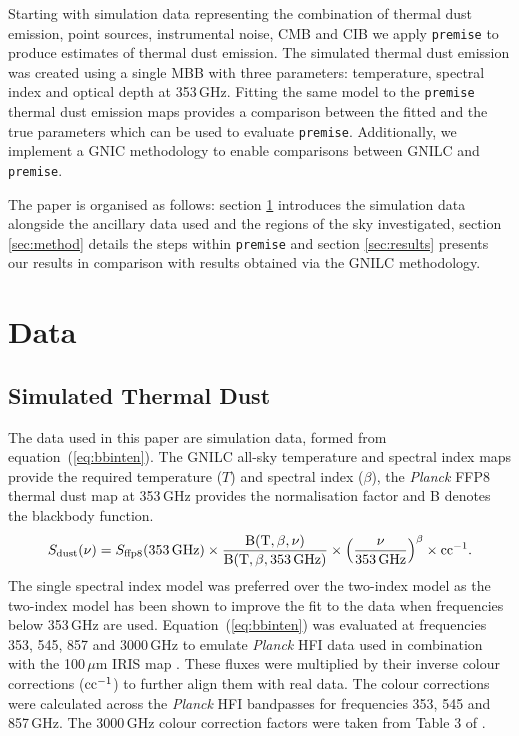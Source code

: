 \documentclass[a4paper,fleqn,usenatbib]{mnras}
\begin{document}
Starting with simulation data representing the combination of thermal dust emission, point sources, instrumental noise, CMB and CIB we apply {\texttt{premise}} to produce estimates of thermal dust emission. The simulated thermal dust emission was created using a single MBB with three parameters: temperature, spectral index and optical depth at 353\,GHz. Fitting the same model to the {\texttt{premise}} thermal dust emission maps provides a comparison between the fitted and the true parameters which can be used to evaluate {\texttt{premise}}. Additionally, we implement a GNIC methodology \citep{gnilc} to enable comparisons between GNILC and {\texttt{premise}}.

The paper is organised as follows: section \ref{sec:data} introduces the simulation data alongside the ancillary data used and the regions of the sky investigated, section \ref{sec:method} details the steps within {\texttt{premise}} and section \ref{sec:results} presents our results in comparison with results obtained via the GNILC methodology.  

\section{Data}
\label{sec:data}
\subsection{Simulated Thermal Dust}

The data used in this paper are simulation data, formed from equation~(\ref{eq:bbinten}).
The GNILC \footnotemark  all-sky temperature and spectral index maps provide the required temperature ($T$)
 and spectral index ($\beta$), the {\it{Planck}} FFP8 \citep{ffp} thermal dust map at 353\,GHz provides the normalisation factor and B denotes the blackbody function.  
\begin{equation}
S_{\rm{dust}}(\nu) = S_{\rm{ffp8}}(353 \, \rm{GHz}) \times \frac{B(T, \beta, \nu)}{B(T, \beta, 353 \, \rm{GHz})} \times
    \left(\frac{\nu}{353 \, \rm{GHz}}\right)^{\beta} \times \rm{cc}^{-1}.
\label{eq:bbinten}
\end{equation}
The single spectral index model was preferred over the two-index model \citep{meis} as the two-index model has been shown to improve the fit to the data when frequencies below 353\,GHz are used. Equation~(\ref{eq:bbinten}) was evaluated at frequencies 353, 545, 857 and 3000\,GHz to emulate {\it{Planck}} HFI data used in combination with the 100\,$\mu$m IRIS map \citep{iris}. These fluxes were multiplied by their inverse colour corrections ($\rm{cc}^{-1}$) to further align them with real data. The colour corrections were calculated across the {\it{Planck}} HFI bandpasses for frequencies 353, 545 and 857\,GHz. The 3000\,GHz colour correction factors were taken from Table 3 of \citet{iris}. 
\end{document}
